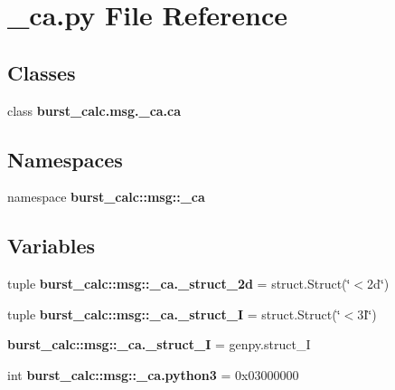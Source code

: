 \section{\-\_\-ca.\-py \-File \-Reference}
\label{__ca_8py}
\subsection*{\-Classes}
\begin{DoxyCompactItemize}
\item 
class {\bf burst\-\_\-calc.\-msg.\-\_\-ca.\-ca}
\end{DoxyCompactItemize}
\subsection*{\-Namespaces}
\begin{DoxyCompactItemize}
\item 
namespace {\bf burst\-\_\-calc\-::msg\-::\-\_\-ca}
\end{DoxyCompactItemize}
\subsection*{\-Variables}
\begin{DoxyCompactItemize}
\item 
tuple {\bf burst\-\_\-calc\-::msg\-::\-\_\-ca.\-\_\-struct\-\_\-2d} = struct.\-Struct(\char`\"{}$<$2d\char`\"{})
\item 
tuple {\bf burst\-\_\-calc\-::msg\-::\-\_\-ca.\-\_\-struct\-\_\-I} = struct.\-Struct(\char`\"{}$<$3\-I\char`\"{})
\item 
{\bf burst\-\_\-calc\-::msg\-::\-\_\-ca.\-\_\-struct\-\_\-\-I} = genpy.\-struct\-\_\-\-I
\item 
int {\bf burst\-\_\-calc\-::msg\-::\-\_\-ca.\-python3} = 0x03000000
\end{DoxyCompactItemize}
